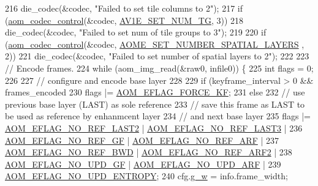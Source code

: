 \begin{DoxyCodeInclude}
{{{{{{{216     die\_codec(&codec, \textcolor{stringliteral}{"Failed to set tile columns to 2"});
217   \textcolor{keywordflow}{if} (\hyperlink{group__codec_ga6da974f4eeaba1fa74106b28d0fe6ac5}{aom\_codec\_control}(&codec, \hyperlink{group__aom__encoder_ggae78dde67a6d78f332e9bdba0dde42db5a9ac0044ad63e6848a482db04f0858c44}{AV1E\_SET\_NUM\_TG}, 3))
218     die\_codec(&codec, \textcolor{stringliteral}{"Failed to set num of tile groups to 3"});
219 
220   \textcolor{keywordflow}{if} (\hyperlink{group__codec_ga6da974f4eeaba1fa74106b28d0fe6ac5}{aom\_codec\_control}(&codec, \hyperlink{group__aom__encoder_ggae78dde67a6d78f332e9bdba0dde42db5aef4facbd3745aa7f2a604faaf68316ff}{AOME\_SET\_NUMBER\_SPATIAL\_LAYERS}
      , 2))
221     die\_codec(&codec, \textcolor{stringliteral}{"Failed to set number of spatial layers to 2"});
222 
223   \textcolor{comment}{// Encode frames.}
224   \textcolor{keywordflow}{while} (aom\_img\_read(&raw0, infile0)) \{
225     \textcolor{keywordtype}{int} flags = 0;
226 
227     \textcolor{comment}{// configure and encode base layer}
228 
229     \textcolor{keywordflow}{if} (keyframe\_interval > 0 && frames\_encoded %
230       flags |= \hyperlink{group__encoder_ga86a6a9053205149cccc98481b5460337}{AOM\_EFLAG\_FORCE\_KF};
231     \textcolor{keywordflow}{else}
232       \textcolor{comment}{// use previous base layer (LAST) as sole reference}
233       \textcolor{comment}{// save this frame as LAST to be used as reference by enhanmcent layer}
234       \textcolor{comment}{// and next base layer}
235       flags |= \hyperlink{group__aom__encoder_ga50c2560ca6670298cfc614ecae96a391}{AOM\_EFLAG\_NO\_REF\_LAST2} | 
      \hyperlink{group__aom__encoder_gaa4bc8ae2b977b73f0ef57ba428ca1d2c}{AOM\_EFLAG\_NO\_REF\_LAST3} |
236                \hyperlink{group__aom__encoder_gaaef6fe76991abf87edd2f296eee999f8}{AOM\_EFLAG\_NO\_REF\_GF} | \hyperlink{group__aom__encoder_ga9e2f989737d63ddf4e987a525d186a46}{AOM\_EFLAG\_NO\_REF\_ARF} |
237                \hyperlink{group__aom__encoder_ga758649aa6cd9fefb15ad888489884a38}{AOM\_EFLAG\_NO\_REF\_BWD} | \hyperlink{group__aom__encoder_gad04799a74215e1b9609f7ccd1766f8c9}{AOM\_EFLAG\_NO\_REF\_ARF2} |
238                \hyperlink{group__aom__encoder_gaa81cc31f95fd463f51a158050d267a36}{AOM\_EFLAG\_NO\_UPD\_GF} | \hyperlink{group__aom__encoder_ga469b4cf5ff76cb30de951e129c25a786}{AOM\_EFLAG\_NO\_UPD\_ARF} |
239                \hyperlink{group__aom__encoder_gac5a69f04b0bc88f755587a1da815d754}{AOM\_EFLAG\_NO\_UPD\_ENTROPY};
240     cfg.\hyperlink{structaom__codec__enc__cfg_a80cb459c5ef3c7e1516f617c4c9d6eab}{g\_w} = info.frame\_width;
}}}}}}}
\end{DoxyCodeInclude}
